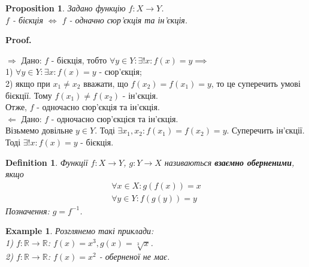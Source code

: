 \documentclass[a4paper, 14pt]{article}
\makeatletter
\def\qed{$\blacksquare$}
\def\rightproof{$\boxed{\Rightarrow}$ }
\def\leftproof{$\boxed{\Leftarrow}$ }
\theoremstyle{theoremdd}
\theoremstyle{theoremdd}
\newtheorem{definition}[theorem]{Definition}
\theoremstyle{theoremdd}
\theoremstyle{theoremdd}
\newtheorem{example}[theorem]{Example}
\theoremstyle{theoremdd}
\newtheorem{proposition}[theorem]{Proposition}
\theoremstyle{theoremdd}
\theoremstyle{theoremdd}
\theoremstyle{theoremdd}
\renewenvironment{proof}[1][Proof.\\]{\par
\pushQED{\hfill \qed}%
\normalfont \topsep6\p@\@plus6\p@\relax
\trivlist
\item\relax
{\bfseries
#1\@addpunct{.}}\hspace\labelsep\ignorespaces
}{%
\popQED\endtrivlist\@endpefalse
}
\makeatother
\begin{document}
	\begin{proposition}
	Задано функцію $f: X \to Y$. \\
	$f$ - бієкція $\iff$ $f$ - одначно сюр'єкція та ін'єкція.
	\end{proposition}
	
	\begin{proof}
	\rightproof Дано: $f$ - бієкція, тобто $\forall y \in Y: \exists! x: f(x) = y \implies $\\
	1) $\forall y \in Y: \exists x: f(x) = y$ - сюр'єкція;\\
	2) якщо при $x_1 \neq x_2$ вважати, що $f(x_2) = f(x_1) = y$, то це суперечить умові бієкції. Тому $f(x_1) \neq f(x_2)$ - ін'єкція.\\
	Отже, $f$ - одночасно сюр'єкція та ін'єкція.
	\bigskip \\
	
	\leftproof Дано: $f$ - одночасно сюр'єкцієя та ін'єкція.\\
	Візьмемо довільне $y \in Y$. Тоді $\exists x_1, x_2: f(x_1) = f(x_2) = y$. Суперечить ін'єкції.\\ 
	Тоді $\exists! x: f(x) = y$ - бієкція.
	\end{proof}
	
	\begin{definition}
	Функції $f: X \to Y$, $g: Y \to X$ називаються \textbf{взаємно оберненими}, якщо
	\begin{align*}
	\forall x \in X: g(f(x)) = x \\
	\forall y \in Y: f(g(y)) = y
	\end{align*}
	Позначення: $g = f^{-1}$.
\begin{figure}[H]
\end{figure}
	\end{definition}
	
	\begin{example} Розглянемо такі приклади:\\
	1) $f: \mathbb{R} \to \mathbb{R}$: \hspace{1cm} $f(x) = x^3, g(x) = \sqrt[3]{x}$. \\
	2) $f: \mathbb{R} \to \mathbb{R}$: \hspace{1cm}
	$f(x) = x^2$ - оберненої не має.
	\end{example}
	
\end{document}
